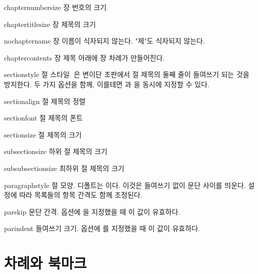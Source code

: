 \documentclass[pairquote, minted]{hzguide}
\begin{document}
\begin{macros}
\item[chapternumbersize] \keyvalue{\HUGE}
장 번호의 크기

\item[chaptertitlesize] \keyvalue{\Huge}
장 제목의 크기 

\item[nochaptername] \keyvalueTF 
장 이름이 식자되지 않는다. "제"도 식자되지 않는다.

\item[chaptercontents] \keyvalueTF
장 제목 아래에 장 차례가 만들어진다.

\item[sectionstyle] 
절 스타일. 은 변이단 조판에서 절 제목의 둘째 줄이 들여쓰기 되는 것을 방지한다.
두 가지 옵션을 함께, 이를테면 과 을 동시에 지정할 수 있다.

\item[sectionalign] \keyvalue{\raggedleft, \centering, \raggedright}
절 제목의 정렬

\item[sectionfont] \keyvalue{\normalfont\bfseries}
절 제목의 폰트

\item[sectionsize] \keyvalue{\Large}
절 제목의 크기

\item[subsectionsize] \keyvalue{\large}
하위 절 제목의 크기

\item[subsubsectionsize] \keyvalue{\normalsize}
최하위 절 제목의 크기

\item[paragraphstyle] 
절 모양. 디폴트는 이다. 이것은 들여쓰기 없이 문단 사이를 띄운다.
설정에 따라 목록들의 항목 간격도 함께 조정된다.

\item[parskip] \keyvalue{0.25\onelineskip}
문단 간격.  옵션에 을 지정했을 때 이 값이 유효하다.

\item[parindent] \keyvalue{1em}
들여쓰기 크기.  옵션에 를 지정했을 때 이 값이 유효하다.
\end{macros}

\section{차례와 북마크}
\end{document}
